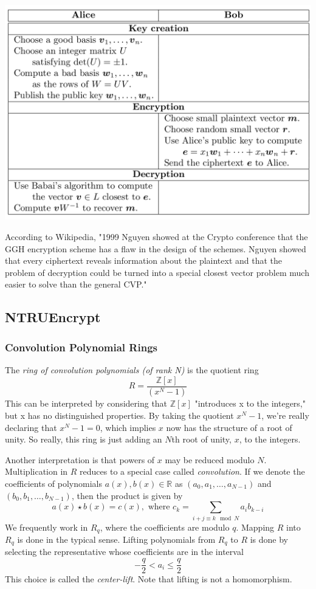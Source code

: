 \documentclass[10pt,a4paper]{article}
\theoremstyle{remark}
\begin{document}
\includegraphics[scale=.2]{GGH.png}

According to Wikipedia, "1999 Nguyen showed at the Crypto conference that the GGH encryption scheme has a flaw in the design of the schemes. Nguyen showed that every ciphertext reveals information about the plaintext and that the problem of decryption could be turned into a special closest vector problem much easier to solve than the general CVP."

\subsection{NTRUEncrypt}

\subsubsection{Convolution Polynomial Rings}
The \textit{ring of convolution polynomials (of rank N)} is the quotient ring
$$R=\frac{\mathbb{Z}[x]}{(x^N-1)}$$ 
This can be interpreted by considering that $\mathbb{Z}[x]$ "introduces x to the integers," but x has no distinguished properties. By taking the quotient $x^N-1$, we're really declaring that $x^N-1=0$, which implies $x$ now has the structure of a root of unity. So really, this ring is just adding an $N$th root of unity, $x$, to the integers.

Another interpretation is that powers of $x$ may be reduced modulo $N$. Multiplication in $R$ reduces to a special case called \textit{convolution}. If we denote the coefficients of polynomials $a(x),b(x)\in \mathbb{R}$ as $(a_0,a_1,\ldots,a_{N-1})$ and $(b_0,b_1,\ldots,b_{N-1})$, then the product is given by
$$a(x)\star b(x)=c(x),\text{ where } c_k=\sum_{i+j\equiv k \mod N}a_ib_{k-i}$$
We frequently work in $R_q$, where the coefficients are modulo $q$. Mapping $R$ into $R_q$ is done in the typical sense. Lifting polynomials from $R_q$ to $R$ is done by selecting the representative whose coefficients are in the interval
$$-\frac{q}{2}<a_i\leq \frac{q}{2}$$
This choice is called the \textit{center-lift}. Note that lifting is not a homomorphism.
\end{document}
